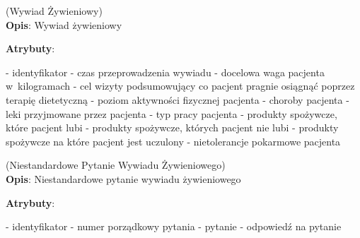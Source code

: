 \begin{enumerate}[label={\textbf{KAT/5/\protect\twodigits{\theenumi}}}, wide, labelwidth=!, labelindent=0pt, labelsep=0pt, series=reqs]
    \label{kat:NutritionalInterview} (Wywiad Żywieniowy)\\
    \indent\textbf{Opis}: Wywiad żywieniowy
    \par
    \textbf{Atrybuty}:
    \begin{itemize}[series=atr, wide, align=left, leftmargin=190pt]
        \label{kat:NutritionalInterview:id}- identyfikator
        \label{kat:NutritionalInterview:completionDate}- czas przeprowadzenia wywiadu
        \label{kat:NutritionalInterview:targetWeight}- docelowa waga pacjenta w~kilogramach
        \label{kat:NutritionalInterview:advicePurpose}- cel wizyty podsumowujący co pacjent pragnie osiągnąć poprzez terapię dietetyczną
        \label{kat:NutritionalInterview:physicalActivity}- poziom aktywności fizycznej pacjenta
        \label{kat:NutritionalInterview:diseases}- choroby pacjenta
        \label{kat:NutritionalInterview:medicines}- leki przyjmowane przez pacjenta
        \label{kat:NutritionalInterview:jobType}- typ pracy pacjenta
        \label{kat:NutritionalInterview:likedProducts}- produkty spożywcze, które pacjent lubi
        \label{kat:NutritionalInterview:dislikedProducts}- produkty spożywcze, których pacjent nie lubi
        \label{kat:NutritionalInterview:foodAllergies}- produkty spożywcze na które pacjent jest uczulony
        \label{kat:NutritionalInterview:foodIntolerances}- nietolerancje pokarmowe pacjenta
    \end{itemize}

    \label{kat:CustomNutritionalInterviewQuestion} (Niestandardowe Pytanie Wywiadu Żywieniowego)\\
    \indent\textbf{Opis}: Niestandardowe pytanie wywiadu żywieniowego
    \par
    \textbf{Atrybuty}:
    \begin{itemize}[series=atr, wide, align=left, leftmargin=190pt]
        \label{kat:CustomNutritionalInterviewQuestion:id}- identyfikator
        \label{kat:CustomNutritionalInterviewQuestion:ordinalNumber}- numer porządkowy pytania
        \label{kat:CustomNutritionalInterviewQuestion:question}- pytanie
        \label{kat:CustomNutritionalInterviewQuestion:answer}- odpowiedź na pytanie
    \end{itemize}


\end{enumerate}
